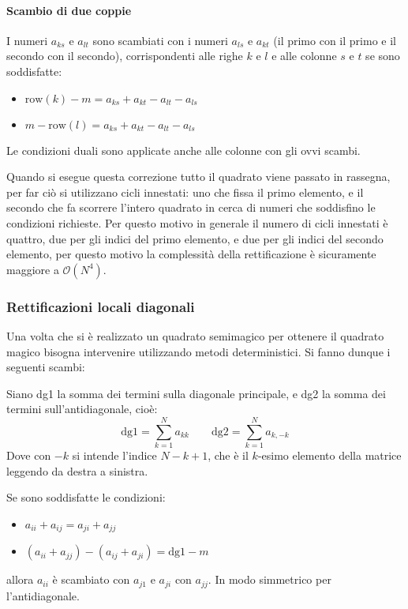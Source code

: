 \documentclass[italian,twoside,twocolumn]{article}
\begin{document}
\paragraph{Scambio di due coppie} I numeri $ a_{ks} $ e $ a_{lt} $ sono scambiati con i numeri $ a_{ls} $ e $ a_{kt} $ (il primo con il primo e il secondo con il secondo), corrispondenti alle righe $ k $ e $ l $ e alle colonne $ s $ e $ t $ se sono soddisfatte:
\begin{itemize}
	\item $ \text{row}(k) - \mathit{m} = a_{ks} + a_{kt} -a_{lt} - a_{ls} $
	\item $ \mathit{m} - \text{row}(l) = a_{ks} + a_{kt} -a_{lt} - a_{ls} $
\end{itemize}

Le condizioni duali sono applicate anche alle colonne con gli ovvi scambi.  

Quando si esegue questa correzione tutto il quadrato viene passato in rassegna, per far ciò si utilizzano cicli innestati: uno che fissa il primo elemento, e il secondo che fa scorrere l'intero quadrato in cerca di numeri che soddisfino le condizioni richieste. Per questo motivo in generale il numero di cicli innestati è quattro, due per gli indici del primo elemento, e due per gli indici del secondo elemento, per questo motivo la complessità della rettificazione è sicuramente maggiore a $\mathcal{O}(N^4)$. 

\subsubsection{Rettificazioni locali diagonali}
Una volta che si è realizzato un quadrato semimagico per ottenere il quadrato magico bisogna intervenire utilizzando metodi deterministici. Si fanno dunque i seguenti scambi:

Siano dg1 la somma dei termini sulla diagonale principale, e dg2 la somma dei termini sull'antidiagonale, cioè:
\[\text{dg1} = \sum_{k = 1}^Na_{kk}  \qquad \text{dg2} = \sum_{k = 1}^Na_{k,-k}  \]
Dove con $ -k $ si intende l'indice $ N-k+1 $, che è il $ k $-esimo elemento della matrice leggendo da destra a sinistra.

Se sono soddisfatte le condizioni:
\begin{itemize}
	\item $ a_{ii} + a_{ij} = a_{ji} + a_{jj} $
	\item $ \left(a_{ii} +  a_{jj} \right) - \left(a_{ij} +  a_{ji} \right) = \text{dg1} - \mathit{m}$
\end{itemize}
allora $ a_{ii} $ è scambiato con $ a_{j1} $ e $ a_{ji} $ con $ a_{jj} $. In modo simmetrico per l'antidiagonale.
\end{document}
